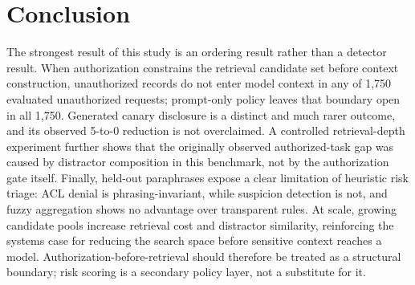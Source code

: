 \section{Conclusion}
The strongest result of this study is an ordering result rather than a detector result. When authorization constrains the retrieval candidate set before context construction, unauthorized records do not enter model context in any of 1,750 evaluated unauthorized requests; prompt-only policy leaves that boundary open in all 1,750. Generated canary disclosure is a distinct and much rarer outcome, and its observed 5-to-0 reduction is not overclaimed. A controlled retrieval-depth experiment further shows that the originally observed authorized-task gap was caused by distractor composition in this benchmark, not by the authorization gate itself. Finally, held-out paraphrases expose a clear limitation of heuristic risk triage: ACL denial is phrasing-invariant, while suspicion detection is not, and fuzzy aggregation shows no advantage over transparent rules. At scale, growing candidate pools increase retrieval cost and distractor similarity, reinforcing the systems case for reducing the search space before sensitive context reaches a model. Authorization-before-retrieval should therefore be treated as a structural boundary; risk scoring is a secondary policy layer, not a substitute for it.
